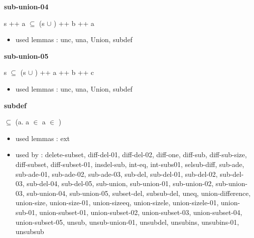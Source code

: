 \documentclass[a4paper]{article}
\begin{document}
\medskip

\bigskip

{\large\bf sub-union-04}

\medskip

 \Fol s ++ a $\subseteq$ (s $\cup$ ) ++ b ++ a

\begin{itemize}


\item       used lemmas  : unc, una, Union, subdef

\end{itemize}

\medskip

\bigskip

{\large\bf sub-union-05}

\medskip

 \Fol s $\subseteq$ (s $\cup$ ) ++ a ++ b ++ c

\begin{itemize}


\item       used lemmas  : unc, una, Union, subdef

\end{itemize}

\medskip

\bigskip

{\large\bf subdef}

\medskip

 \Fol {} $\subseteq$  \Equiv (\All a. a $\in$  \Imp a $\in$ )

\begin{itemize}


\item       used lemmas  : ext
\item       used by      : delete-subset, diff-del-01, diff-del-02, diff-one, diff-sub, diff-sub-size, diff-subset, diff-subset-01, insdel-sub, int-eq, int-subs01, selsub-diff, sub-ade, sub-ade-01, sub-ade-02, sub-ade-03, sub-del, sub-del-01, sub-del-02, sub-del-03, sub-del-04, sub-del-05, sub-union, sub-union-01, sub-union-02, sub-union-03, sub-union-04, sub-union-05, subset-del, subsub-del, uneq, union-difference, union-size, union-size-01, union-sizeeq, union-sizele, union-sizele-01, union-sub-01, union-subset-01, union-subset-02, union-subset-03, union-subset-04, union-subset-05, unsub, unsub-union-01, unsubdel, unsubins, unsubins-01, unsubsub

\end{itemize}
\end{document}
